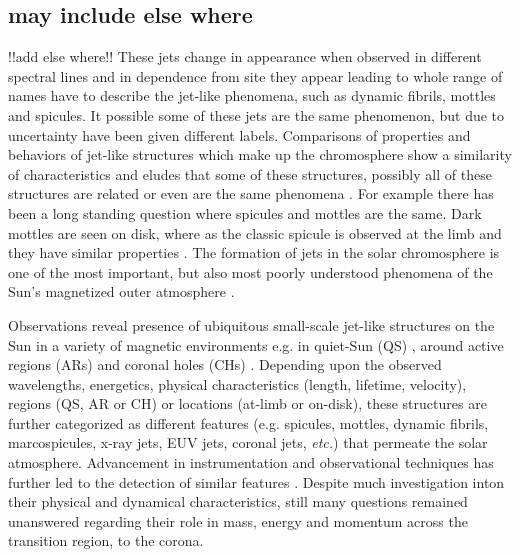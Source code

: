\documentclass[12pt]{ociamthesis}
\newcommand{\np}{\\ \\}
\begin{document}
\subsection{may include else where}
{\color{green} !!add else where!! }These jets change in appearance when observed in different spectral lines and in dependence from site they appear leading to whole range of names have to describe the jet-like phenomena, such as dynamic fibrils, mottles and spicules. It possible some of these jets are the same phenomenon, but due to uncertainty have been given different labels. Comparisons of properties and behaviors of jet-like structures which make up the chromosphere show a similarity of characteristics and eludes that some of these structures, possibly all of these structures are related or even are the same phenomena \cite{Porfir2016A}. For example there has been a long standing question where spicules and mottles are the same. Dark mottles are seen on disk, where as the classic spicule is observed at the limb and they have similar properties \cite{Pontieu2007ASPC}. The formation of jets in the solar chromosphere is one of the most important, but also most poorly understood phenomena of the Sun's magnetized outer atmosphere \citep{Hansteen2006ApJ}.

Observations reveal presence of ubiquitous small-scale jet-like structures on the Sun in a variety of magnetic environments e.g. in quiet-Sun (QS) \citep{Pontieu2007astroph2081D,Rouppe2007ApJ660L169R,Pereira2012,Pereira2014ApJ}, around active regions (ARs) \citep{Pontieu2007astroph2081D,Pereira2012,Rouppe2013ApJ77656R,Gafeira2017ApJS2296G} and coronal holes (CHs) \citep{Yamauchi2005ApJ629572Y,Moreno2008ApJ673L211M,Pereira2012,Young2015ApJ801124Y}. Depending upon the observed wavelengths, energetics, physical characteristics (length, lifetime, velocity), regions (QS, AR or CH) or locations (at-limb or on-disk), these structures are further categorized as different features (e.g. spicules, mottles, dynamic fibrils, marcospicules, x-ray jets, EUV jets, coronal jets, \textit{etc.}) that permeate the solar atmosphere. Advancement in instrumentation and observational techniques has further led to the detection of similar features \citep[\textit{e.g.}][]{Gafeira2017, Cho2019ApJ884L38C}. Despite much investigation inton their physical and dynamical characteristics, still many questions remained unanswered regarding their role in mass, energy and momentum across the transition region, to the corona. \np
\end{document}
